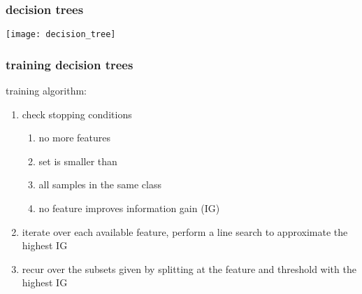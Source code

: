 \begin{frame}
  \frametitle{decision trees}
  
  	{
          \begin{center}
	  \texttt{[image: decision\_tree]}
          \end{center}
	}

\end{frame}

\begin{frame}
  \frametitle{training decision trees}
  
  training algorithm:
  \begin{enumerate}
  \item check stopping conditions
    \begin{enumerate}
    \item no more features
    \item set is smaller than 
    \item all samples in the same class
    \item no feature improves information gain (IG)
    \end{enumerate}
  \item iterate over each available feature, perform a line search to approximate the highest IG
  \item recur over the subsets given by splitting at the feature and threshold with the highest IG 
  \end{enumerate}
  
\end{frame}
